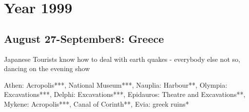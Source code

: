 \chapter{Year 1999}
\label{1999}

\section{August 27-September8: Greece}
\label{1999:Greece}


Japanese Tourists know how to deal with earth quakes - everybody else not so, dancing on the evening show

Athen: Acropolis***, National Museum***, Nauplia: Harbour**, Olympia: Excavations***, Delphi: Excavations***, Epidauros: Theatre and Excavations**, Mykene: Acropolis***, Canal of Corinth**, Evia: greek ruins*

